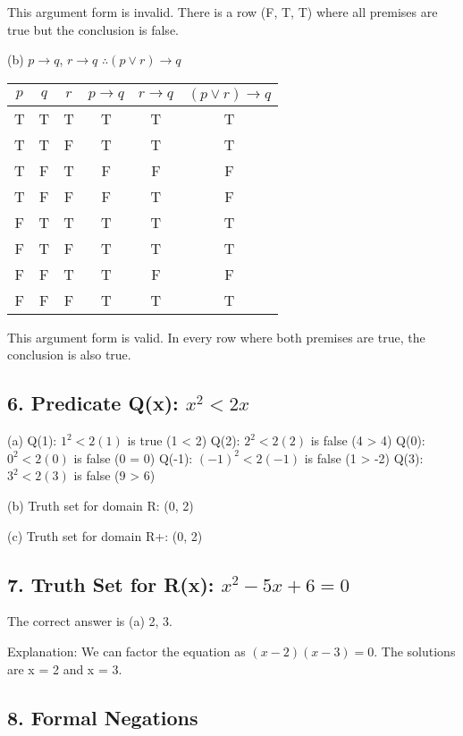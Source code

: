 \documentclass{article}
\begin{document}
This argument form is invalid. There is a row (F, T, T) where all premises are true but the conclusion is false.

(b) $p \rightarrow q$, $r \rightarrow q$ $\therefore (p \vee r) \rightarrow q$

\begin{center}
\begin{tabular}{|c|c|c|c|c|c|}
\hline
$p$ & $q$ & $r$ & $p \rightarrow q$ & $r \rightarrow q$ & $(p \vee r) \rightarrow q$ \\
\hline
T & T & T & T & T & T \\
T & T & F & T & T & T \\
T & F & T & F & F & F \\
T & F & F & F & T & F \\
F & T & T & T & T & T \\
F & T & F & T & T & T \\
F & F & T & T & F & F \\
F & F & F & T & T & T \\
\hline
\end{tabular}
\end{center}

This argument form is valid. In every row where both premises are true, the conclusion is also true.

\subsection*{6. Predicate Q(x): $x^2 < 2x$}

(a) Q(1): $1^2 < 2(1)$ is true (1 < 2)
    Q(2): $2^2 < 2(2)$ is false (4 > 4)
    Q(0): $0^2 < 2(0)$ is false (0 = 0)
    Q(-1): $(-1)^2 < 2(-1)$ is false (1 > -2)
    Q(3): $3^2 < 2(3)$ is false (9 > 6)

(b) Truth set for domain R: (0, 2)

(c) Truth set for domain R+: (0, 2)

\subsection*{7. Truth Set for R(x): $x^2 - 5x + 6 = 0$}

The correct answer is (a) {2, 3}.

Explanation: We can factor the equation as $(x-2)(x-3) = 0$. The solutions are x = 2 and x = 3.

\subsection*{8. Formal Negations}
\end{document}
